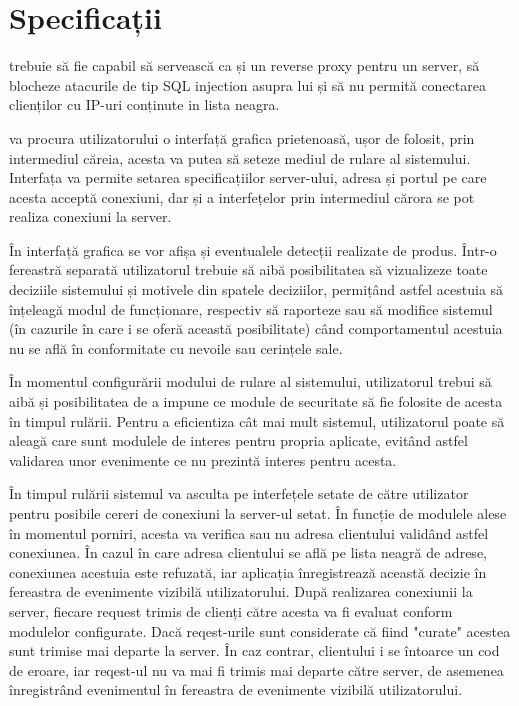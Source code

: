  \section{Specificații}
\textit{\thesistitle}  trebuie să fie capabil să servească ca și un reverse proxy pentru un server, să blocheze atacurile de tip SQL injection asupra lui și să nu permită conectarea clienților cu IP-uri conținute in lista neagra. 

\textit{\thesistitle}  va procura utilizatorului o interfață grafica prietenoasă, ușor de folosit, prin intermediul căreia, acesta va putea să seteze mediul de rulare al sistemului. Interfața va permite setarea specificațiilor server-ului, adresa și portul pe care acesta acceptă conexiuni, dar și a interfețelor prin intermediul cărora se pot realiza conexiuni la server. 
  
În interfață grafica se vor afișa și eventualele detecții realizate de produs. Într-o fereastră separată utilizatorul trebuie să aibă posibilitatea să vizualizeze toate deciziile sistemului și motivele din spatele deciziilor, permițând astfel acestuia să înțeleagă modul de funcționare, respectiv să raporteze sau să modifice sistemul (în cazurile în care i se oferă această posibilitate) când comportamentul acestuia nu se află în conformitate cu nevoile sau cerințele sale. 

În momentul configurării modului de rulare al sistemului, utilizatorul trebui să aibă și posibilitatea de a impune ce module de securitate să fie folosite de acesta în timpul rulării. Pentru a eficientiza cât mai mult sistemul, utilizatorul poate să aleagă care sunt modulele de interes pentru propria aplicate, evitând astfel validarea unor evenimente ce nu prezintă interes pentru acesta. 

 
În timpul rulării sistemul va asculta pe interfețele setate de către utilizator pentru posibile cereri de conexiuni la server-ul setat. În funcție de modulele alese în momentul porniri, acesta va verifica sau nu adresa clientului validând astfel conexiunea. În cazul în care adresa clientului se află pe lista neagră de adrese, conexiunea acestuia este refuzată, iar aplicația înregistrează această decizie în fereastra de evenimente vizibilă utilizatorului. După realizarea conexiunii la server, fiecare request trimis de clienți către acesta va fi evaluat conform modulelor configurate. Dacă reqest-urile sunt considerate că fiind "curate" acestea sunt trimise mai departe la server. În caz contrar, clientului i se întoarce un cod de eroare, iar reqest-ul nu va mai fi trimis mai departe către server, de asemenea înregistrând evenimentul în fereastra de evenimente vizibilă utilizatorului. 


